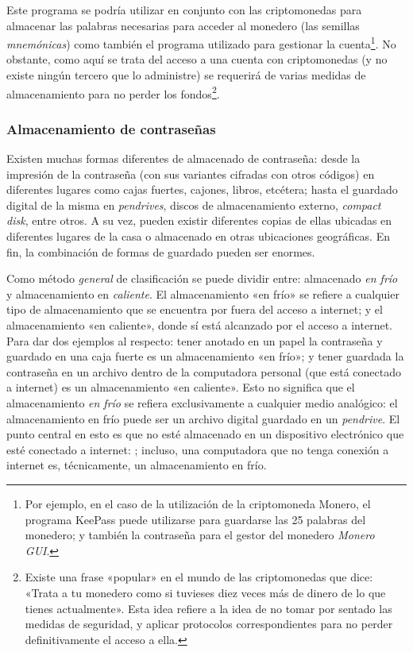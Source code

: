 \documentclass[12pt,a4paper,twoside]{book}
\begin{document}
Este programa se podría utilizar en conjunto con las criptomonedas para almacenar las palabras necesarias para acceder al monedero (las semillas \textit{mnemónicas}) como también el programa utilizado para gestionar la cuenta\footnote{Por ejemplo, en el caso de la utilización de la criptomoneda Monero, el programa KeePass puede utilizarse para guardarse las 25 palabras del monedero; y también la contraseña para el gestor del monedero \textit{Monero GUI}.}. No obstante, como aquí se trata del acceso a una cuenta con criptomonedas (y no existe ningún tercero que lo administre) se requerirá de varias medidas de almacenamiento para no perder los fondos\footnote{Existe una frase «popular» en el mundo de las criptomonedas que dice: «Trata a tu monedero como si tuvieses diez veces más de dinero de lo que tienes actualmente». Esta idea refiere a la idea de no tomar por sentado las medidas de seguridad, y aplicar protocolos correspondientes para no perder definitivamente el acceso a ella.}.

\subsubsection{Almacenamiento de contraseñas}
Existen muchas formas diferentes de almacenado de contraseña: desde la impresión de la contraseña (con sus variantes cifradas con otros códigos) en diferentes lugares como cajas fuertes, cajones, libros, etcétera; hasta el guardado digital de la misma en \textit{pendrives}, discos de almacenamiento externo, \textit{compact disk}, entre otros. A su vez, pueden existir diferentes copias de ellas ubicadas en diferentes lugares de la casa o almacenado en otras ubicaciones geográficas. En fin, la combinación de formas de guardado pueden ser enormes.

Como método \textit{general} de clasificación se puede dividir entre: almacenado \textit{en frío} y almacenamiento en \textit{caliente}. El almacenamiento «en frío» se refiere a cualquier tipo de almacenamiento que se encuentra por fuera del acceso a internet; y el almacenamiento «en caliente», donde sí está alcanzado por el acceso a internet. Para dar dos ejemplos al respecto: tener anotado en un papel la contraseña y guardado en una caja fuerte es un almacenamiento «en frío»; y tener guardada la contraseña en un archivo dentro de la computadora personal (que está conectado a internet) es un almacenamiento «en caliente». Esto no significa que el almacenamiento \textit{en frío} se refiera exclusivamente a cualquier medio analógico: el almacenamiento en frío puede ser un archivo digital guardado en un \textit{pendrive}. El punto central en esto es que no esté almacenado en un dispositivo electrónico que esté conectado a internet: ; incluso, una computadora que no tenga conexión a internet es, técnicamente, un almacenamiento en frío.
\end{document}
